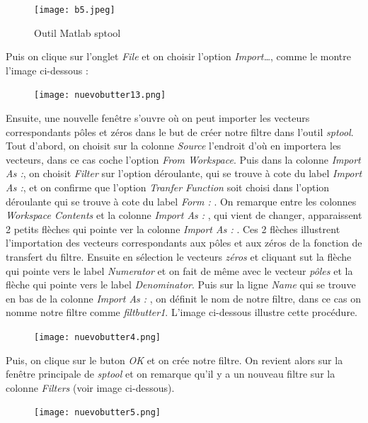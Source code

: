\documentclass[conference,onecolumn]{IEEEtran}
\begin{document}
 \begin{figure}[H]
 \centering
    \texttt{[image: b5.jpeg]}
    \caption{Outil Matlab sptool}
\end{figure}


Puis on clique sur l’onglet \textit{File} et on choisir l’option \textit{Import…}, comme le montre l’image ci-dessous :

 \begin{figure}[H]
 \centering
    \texttt{[image: nuevobutter13.png]}
\end{figure}

Ensuite, une nouvelle fenêtre s’ouvre où on peut importer les vecteurs correspondants pôles et zéros dans le but de créer notre filtre dans l’outil \textit{sptool}. Tout d’abord, on choisit sur la colonne \textit{Source} l’endroit d’où en importera les vecteurs, dans ce cas coche l’option \textit{From Workspace}. Puis dans la colonne \textit{Import As :}, on choisit \textit{Filter} sur l’option déroulante, qui se trouve à cote du label \textit{Import As :}, et on confirme que l’option \textit{Tranfer Function} soit choisi dans l’option déroulante qui se trouve à cote du label \textit{Form : }. On remarque entre les colonnes \textit{Workspace Contents} et la colonne \textit{Import As : }, qui vient de changer, apparaissent 2 petits flèches qui pointe ver la colonne \textit{Import As : }. Ces 2 flèches illustrent l’importation des vecteurs correspondants aux pôles et aux zéros de la fonction de transfert du filtre. Ensuite en sélection le vecteurs \textit{zéros} et cliquant sut la flèche qui pointe vers le label \textit{Numerator} et on fait de même avec le vecteur \textit{pôles} et la flèche qui pointe vers le label \textit{Denominator}. Puis sur la ligne \textit{Name} qui se trouve en bas de la colonne \textit{Import As : }, on définit le nom de notre filtre, dans ce cas on nomme notre filtre comme \textit{filtbutter1}. L’image ci-dessous illustre cette procédure.

 \begin{figure}[H]
 \centering
    \texttt{[image: nuevobutter4.png]}
\end{figure}

Puis, on clique sur le buton \textit{OK} et on crée notre filtre. On revient alors sur la fenêtre principale de \textit{sptool} et on remarque qu'il y a un nouveau filtre sur la colonne \textit{Filters} (voir image ci-dessous).

\begin{figure}[H]
 \centering
    \texttt{[image: nuevobutter5.png]}
\end{figure}
\end{document}

